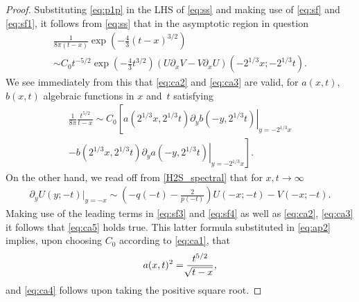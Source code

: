 \documentclass[10pt,reqno]{amsart}
\theoremstyle{plain}
\theoremstyle{definition}
\theoremstyle{remark}
\begin{document}
\begin{proof}
Substituting \eqref{eq:p1p} in the LHS of \eqref{eq:ss} and making use of \eqref{eq:sf} and \eqref{eq:sf1},
it follows from \eqref{eq:ss} that in the asymptotic region in question 
\begin{multline}
\frac{1}{8 \pi(t-x)} \exp \left( -\tfrac{4}{3}(t-x)^{3/2} \right)
\\
  \sim C_0 t^{-5/2}  \exp \left( -\tfrac{4}{3}t^{3/2} \right) 
		\left( U \partial_x V -V \partial_x U \right) (-2^{1/3}x;-2^{1/3}t).
\label{ap1}
\end{multline}
We see immediately from this that \eqref{eq:ca2} and \eqref{eq:ca3} are valid, for $a(x,t)$, $b(x,t)$ algebraic
functions in $x$ and~$t$ satisfying
\begin{multline}
\frac{1}{8 \pi} \frac{ t^{5/2} } {t-x} \sim 
	C_0  \left[ \left. a(2^{1/3}x,2^{1/3}t)  \partial_y b (-y, 2^{1/3}t) \right|_{y=-2^{1/3}x}  \right.
\\ 	\left.
			  - \left. b(2^{1/3}x,2^{1/3}t)  \partial_y a(-y, 2^{1/3}t) \right|_{y=-2^{1/3}x }  \right] .    
\label{eq:ap2}
\end{multline}
On the other hand, we read off from \eqref{H2S_spectral} that for $x,t \rightarrow \infty$
\begin{align*}
\partial_y \left. U(y;-t) \right|_{y=-x} \sim \left( -q(-t) - \frac{2}{p(-t)} \right) U(-x;-t) - V(-x;-t).
\end{align*}
Making use of the leading terms in \eqref{eq:sf3} and \eqref{eq:sf4} as well as \eqref{eq:ca2}, \eqref{eq:ca3} 
it follows that \eqref{eq:ca5} holds true. This latter formula substituted in \eqref{eq:ap2} implies, 
upon choosing $C_0$ according to \eqref{eq:ca1}, that 
\begin{align*}
 a(x,t)^2 = \frac{t^{5/2}}{{ \hspace{-0.5pt} \sqrt[]{{t-x}}}} ,
\end{align*}
and \eqref{eq:ca4} follows upon taking the positive square root.


\end{proof}
\end{document}
